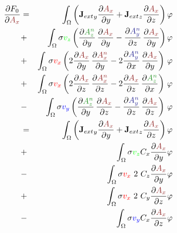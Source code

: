\documentclass[smallextended]{svjour3}       %
\begin{document}
			\begin{eqnarray}
			\frac{\partial F_0}{\partial \textcolor{darkred}{A_x}} & = &
			\int_{\Omega} \left({\mathbf{J}_{ext}}_y \frac{\partial \textcolor{darkred}{A_x}}{\partial y} + {\mathbf{J}_{ext}}_z \frac{\partial \textcolor{darkred}{A_x}}{\partial z}\right) \varphi			
			\nonumber \\
			& + &\int_{\Omega} \sigma \textcolor{gre}{v_z} \left(\frac{\partial \textcolor{darkgre}{A_z^n}}{\partial y}\,\frac{\partial \textcolor{darkred}{A_x}}{\partial y} - \frac{\partial \textcolor{darkblu}{A_y^n}}{\partial z}\,\frac{\partial \textcolor{darkred}{A_x}}{\partial y} \right) \varphi \nonumber \\			
			& + & \int_{\Omega} \sigma \textcolor{red}{v_x} \left( 2 \frac{\partial \textcolor{darkred}{A_x}}{\partial y}\,\frac{\partial \textcolor{darkred}{A_x^n}}{\partial y} - 2 \frac{\partial \textcolor{darkblu}{A_y^n}}{\partial x}\,\frac{\partial \textcolor{darkred}{A_x}}{\partial y} \right)\, \varphi \nonumber \\			
			& + & \int_{\Omega} \sigma \textcolor{red}{v_x} \left(2 \frac{\partial \textcolor{darkred}{A_x}}{\partial z}\,\frac{\partial \textcolor{darkred}{A_x^n}}{\partial z} - 2 \frac{\partial \textcolor{darkred}{A_x}}{\partial z}\,\frac{\partial \textcolor{darkgre}{A_z^n}}{\partial x} \right)\, \varphi \nonumber \\			
			& - & \int_{\Omega} \sigma \textcolor{blu}{v_y} \left(\frac{\partial \textcolor{darkgre}{A_z^n}}{\partial y}\,\frac{\partial \textcolor{darkred}{A_x}}{\partial z} - \frac{\partial \textcolor{darkblu}{A_y^n}}{\partial z}\,\frac{\partial \textcolor{darkred}{A_x}}{\partial z} \right)\, \varphi\\
			 & = &
			\int_{\Omega} \left({\mathbf{J}_{ext}}_y \frac{\partial \textcolor{darkred}{A_x}}{\partial y} + {\mathbf{J}_{ext}}_z \frac{\partial \textcolor{darkred}{A_x}}{\partial z}\right) \varphi			
			\nonumber \\
			& + &\int_{\Omega} \sigma  \textcolor{gre}{v_z}    C_x \frac{\partial \textcolor{darkred}{A_x}}{\partial y} \varphi \nonumber \\			
			& - & \int_{\Omega} \sigma \textcolor{red}{v_x}\ 2\ C_z \frac{\partial \textcolor{darkred}{A_x}}{\partial y} \varphi \nonumber \\			
			& + & \int_{\Omega} \sigma \textcolor{red}{v_x}\ 2\ C_y \frac{\partial \textcolor{darkred}{A_x}}{\partial z} \varphi \nonumber \\			
			& - & \int_{\Omega} \sigma \textcolor{blu}{v_y}    C_x \frac{\partial \textcolor{darkred}{A_x}}{\partial z} \varphi
						\end{eqnarray}
						
\end{document}
